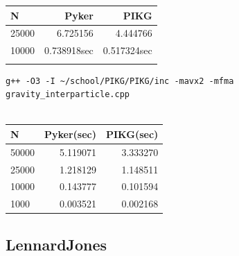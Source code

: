 \documentclass[ams, a4j]{U-AizuGT}
\begin{document}
\begin{tabular}{|l|r|r|} \hline
  N & Pyker & PIKG \\ \hline
  25000 & 6.725156 & 4.444766 \\
  10000 & 0.738918sec & 0.517324sec \\


 \\ \hline
\end{tabular}


\begin{lstlisting}[frame=single, caption=Nbody-kernel.pikg, label=Nbody-kernel.pikg]
  g++ -O3 -I ~/school/PIKG/PIKG/inc -mavx2 -mfma gravity_interparticle.cpp
  
  \end{lstlisting}



  \begin{tabular}{|l|r|r|} \hline
    N & Pyker(sec) & PIKG(sec) \\ \hline
    50000 & 5.119071 & 3.333270\\
    25000 & 1.218129 & 1.148511 \\
    10000 & 0.143777 & 0.101594 \\
    1000 &  0.003521 & 0.002168 \\ \hline
  \end{tabular}
  

\subsection{LennardJones}
\end{document}

